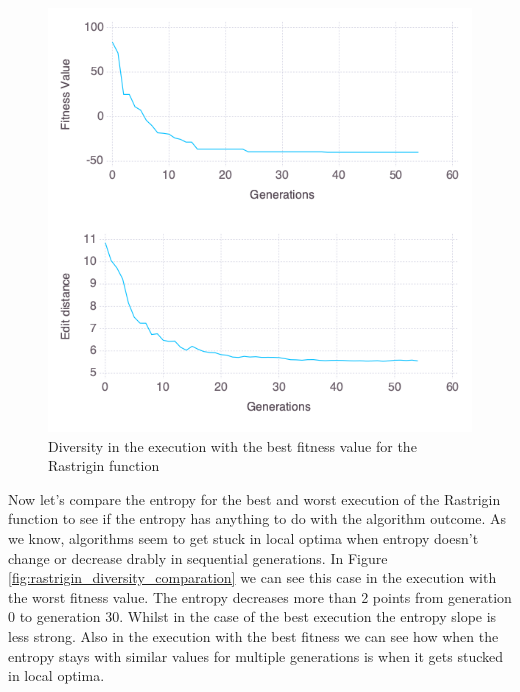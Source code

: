 \begin{figure}[]
	\centering	
	\includegraphics[scale=0.5]{./figures/config_file_10_Rastrigin_diversity.png}
	\caption{ Diversity in the execution with the best fitness value for the Rastrigin function }
    \label{fig:best_restrigin_diversity}
\end{figure}

Now let's compare the entropy for the best and worst execution of the Rastrigin function to see if the entropy has 
anything to do with the algorithm outcome. As we know, algorithms seem to get stuck in local optima when
entropy doesn't change or decrease drably in sequential generations. In Figure \ref{fig:rastrigin_diversity_comparation} we can see
this case in the execution with the worst fitness value. The entropy decreases more than 2 points from generation 0 to generation 30.
Whilst in the case of the best execution the entropy slope is less strong. Also in the execution with the best fitness we can see how
when the entropy stays with similar values for multiple generations is when it gets stucked in local optima.

